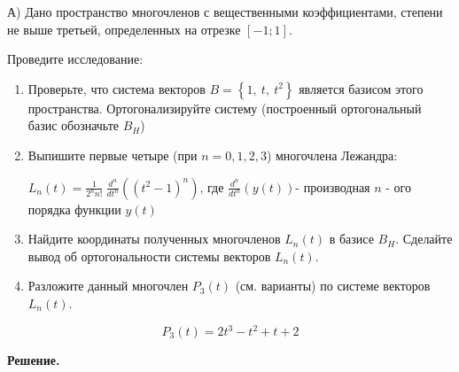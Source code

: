 А) Дано пространство многочленов с вещественными коэффициентами, степени не выше третьей, определенных на отрезке $[-1; 1]$.

Проведите исследование:
\begin{enumerate}
    \item Проверьте, что система векторов $B=\left\{1,\ t,\ t^2\right\}$ является базисом этого пространства. Ортогонализируйте систему (построенный ортогональный базис обозначьте $B_H$)
    \item Выпишите первые четыре (при $n=0,1,2,3$) многочлена Лежандра:

    $\displaystyle L_n\left(t\right)=\frac{1}{2^nn!}\ \frac{d^n}{dt^n}\left(\left(t^2-1\right)^n\right)\text{, где }\frac{d^n}{dt^n}\left(y\left(t\right)\right)$- производная $n$ - ого порядка функции $y\left(t\right)$
    \item Найдите координаты полученных многочленов $L_n\left(t\right)$ в базисе $B_H$. Сделайте вывод об ортогональности системы векторов $L_n\left(t\right)$.
    \item Разложите данный многочлен $P_3\left(t\right)$ (см. варианты) по системе векторов $L_n\left(t\right)$.
\end{enumerate}

\[P_3\left(t\right)=2t^3-t^2+t+2\]

\vspace{10mm}

\textbf{Решение.}

